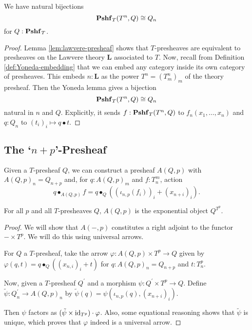 \begin{lemma}\label{rem:presheaf-Yoneda}
  We have natural bijections
  \[ \mathbf{Pshf}_{T}(T^n, Q) \cong Q_n \]
  for $ Q : \mathbf{Pshf}_{T} $.
\end{lemma}
\begin{proof}
  Lemma \ref{lem:lawvere-presheaf} shows that $ T $-presheaves are equivalent to presheaves on the Lawvere theory $ \mathbf L $ associated to $ T $. Now, recall from Definition \ref{def:Yoneda-embedding} that we can embed any category inside its own category of presheaves. This embeds $ n: \mathbf L $ as the power $ T^n = (T_m^n)_m $ of the theory presheaf. Then the Yoneda lemma gives a bijection
  \[ \mathbf{Pshf}_{T}(T^n, Q) \cong Q_n \]
  natural in $ n $ and $ Q $. Explicitly, it sends $ f: \mathbf{Pshf}_{T}(T^n, Q) $ to $ f_n(x_1, \dots, x_n) $ and $ q: Q_n $ to $ (t_i)_i \mapsto q \bullet t $.
\end{proof}

\subsection{The `\texorpdfstring{$ n + p $}{n + p}'-Presheaf}

\begin{example}
  Given a $ T $-presheaf $ Q $, we can construct a presheaf $ A(Q, p) $ with $ A(Q, p)_n = Q_{n + p} $ and, for $ q: A(Q, p)_m $ and $ f: T_n^m $, action
  \[ q \bullet_{A(Q, p)} f = q \bullet_Q ((\iota_{n, p} (f_i))_i + (x_{n + i})_i). \]
\end{example}

\begin{lemma}
  For all $ p $ and all $ T $-presheaves $ Q $, $ A(Q, p) $ is the exponential object $ Q^{T^p} $.
\end{lemma}
\begin{proof}
  We will show that $ A(-, p) $ constitutes a right adjoint to the functor $ - \times T^p $. We will do this using universal arrows.

  For $ Q $ a $ T $-presheaf, take the arrow $ \varphi: A(Q, p) \times T^p \to Q $ given by $ \varphi(q, t) = q \bullet_Q ((x_{n, i})_i + t) $ for $ q: A(Q, p)_n = Q_{n + p} $ and $ t: T^p_n $.

  Now, given a $ T $-presheaf $ Q^\prime $ and a morphism $ \psi: Q^\prime \times T^p \to Q $. Define $ \tilde \psi: Q^\prime_n \to A(Q, p)_n $ by $ \tilde \psi(q) = \psi(\iota_{n, p}(q), (x_{n + i})_i) $.

  Then $ \psi $ factors as $ (\tilde \psi \times \text{id}_{T^p}) \cdot \varphi $. Also, some equational reasoning shows that $ \tilde \psi $ is unique, which proves that $ \varphi $ indeed is a universal arrow.
\end{proof}

